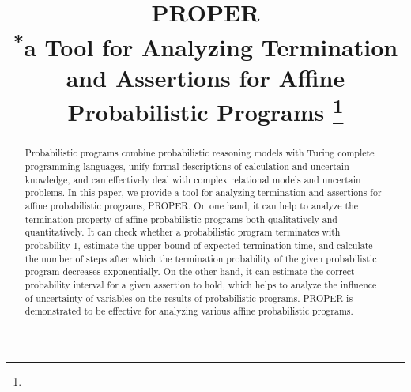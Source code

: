 \documentclass[conference]{IEEEtran}
\begin{document}
\title{PROPER\\
{\footnotesize \textsuperscript{*}a Tool for Analyzing Termination and Assertions for Affine Probabilistic Programs}
\thanks{}
}

\author{
\and
{}
\and
{}
}


\maketitle

\begin{abstract}
Probabilistic programs combine probabilistic reasoning models with Turing complete programming languages, unify formal descriptions of calculation and uncertain knowledge, and can effectively deal with complex relational models and uncertain problems. In this paper, we provide a tool for analyzing termination and assertions for affine probabilistic programs, PROPER. On one hand, it can help to analyze the termination property of affine probabilistic programs both qualitatively and quantitatively. It can check whether a probabilistic program terminates with probability 1, estimate the upper bound of expected termination time, and calculate the number of steps after which the termination probability of the given probabilistic program decreases exponentially.
On the other hand, it can estimate the correct probability interval for a given assertion to hold, which helps to analyze the influence of uncertainty of variables on the results of probabilistic programs. PROPER is demonstrated to be effective for analyzing various affine probabilistic programs.
\end{abstract}
\end{document}

